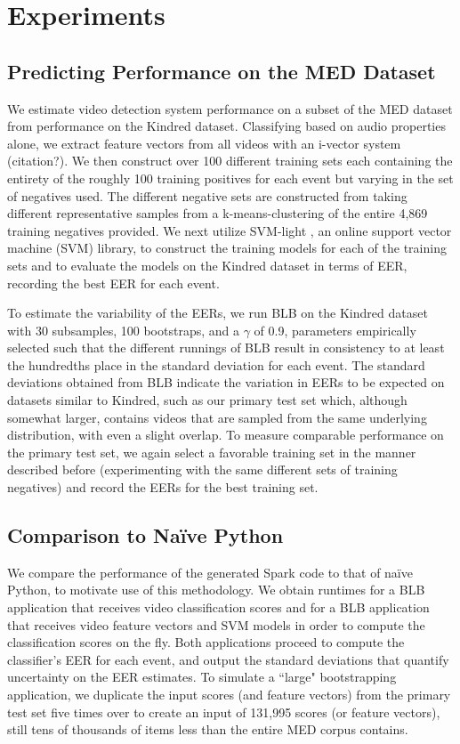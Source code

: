 
\section{Experiments}

\subsection{Predicting Performance on the MED Dataset}

We estimate video detection system performance on a subset of the MED dataset from performance on the Kindred dataset.
Classifying based on audio properties alone, we extract feature vectors from all videos with an i-vector system (citation?).
We then construct over 100 different training sets each containing the entirety of the roughly 100 training positives for each event but varying in the set of negatives used. The different negative sets are constructed from taking different representative samples from a k-means-clustering of the entire 4,869 training negatives provided.
We next utilize SVM-light \cite{svm}, an online support vector machine (SVM) library, to construct the training models for each of the training sets and to evaluate the models on the Kindred dataset in terms of EER, recording the best EER for each event.

To estimate the variability of the EERs, we run BLB on the Kindred dataset with 30 subsamples, 100 bootstraps, and a $\gamma$ of 0.9, parameters empirically selected such that the different runnings of BLB result in consistency to at least the hundredths place in the standard deviation for each event. 
The standard deviations obtained from BLB indicate the variation in EERs to be expected on datasets similar to Kindred, such as our primary test set which, although somewhat larger, contains videos that are sampled from the same underlying distribution, with even a slight overlap. 
To measure comparable performance on the primary test set, we again select a favorable training set in the manner described before (experimenting with the same different sets of training negatives) and record the EERs for the best training set. 

\subsection{Comparison to Na\"ive Python}

We compare the performance of the generated Spark code to that of na\"{i}ve Python, to motivate use of this methodology. 
We obtain runtimes for a BLB application that receives video classification scores and for a BLB application that receives video feature vectors and SVM models in order to compute the classification scores on the fly. 
Both applications proceed to compute the classifier's EER for each event, and output the standard deviations that quantify uncertainty on the EER estimates. 
To simulate a ``large" bootstrapping application, we duplicate the input scores (and feature vectors) from the primary test set five times over to create an input of 131,995 scores (or feature vectors), still tens of thousands of items less than the entire MED corpus contains. 


